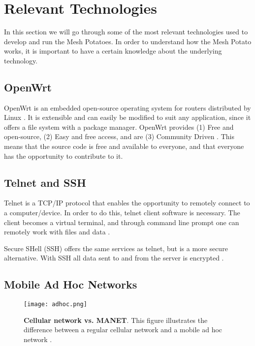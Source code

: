 \section{Relevant Technologies}
In this section we will go through some of the most relevant technologies used to develop and run the Mesh Potatoes. In order to understand how the Mesh Potato works, it is important to have a certain knowledge about the underlying technology. 

\subsection{OpenWrt}
\label{subsec:openwrt}
OpenWrt is an embedded open-source operating system for routers distributed by Linux \cite{openwrt}. It is extensible and can easily be modified to suit any application, since it offers a file system with a package manager. OpenWrt provides (1) Free and open-source, (2) Easy and free access, and are (3) Community Driven \cite{openwrt}. This means that the source code is free and available to everyone, and that everyone has the opportunity to contribute to it. 

\subsection{Telnet and SSH}

Telnet is a TCP/IP protocol that enables the opportunity to remotely connect to a computer/device. In order to do this, telnet client software is necessary. The client becomes a virtual terminal, and through command line prompt one can remotely work with files and data \cite{telnet}. 

Secure SHell (SSH) offers the same services as telnet, but is a more secure alternative. With SSH all data sent to and from the server is encrypted \cite{SSH}. 


\subsection{Mobile Ad Hoc Networks}

\begin{figure}[b]
  \centering
    \texttt{[image: adhoc.png]}
     \caption [Cellular network vs. MANET]{\textbf{Cellular network vs. MANET}. This figure illustrates the difference between a regular cellular network and a mobile ad hoc network \cite{adhoc2}.}
\label{fig:adhoc}
\end{figure}

